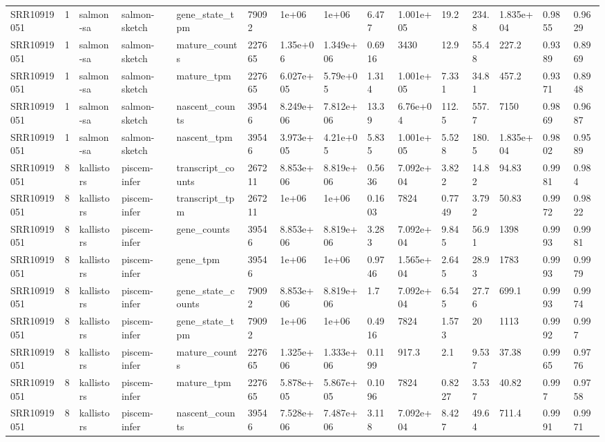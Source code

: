 \begin{tabular}{lllllllllllllll}
SRR10919051 & 1 & salmon-sa & salmon-sketch & gene\_state\_tpm & 79092 & 1e+06 & 1e+06 & 6.477 & 1.001e+05 & 19.2 & 234.8 & 1.835e+04 & 0.9855 & 0.9629 \\
SRR10919051 & 1 & salmon-sa & salmon-sketch & mature\_counts & 227665 & 1.35e+06 & 1.349e+06 & 0.6916 & 3430 & 12.9 & 55.48 & 227.2 & 0.9389 & 0.8969 \\
SRR10919051 & 1 & salmon-sa & salmon-sketch & mature\_tpm & 227665 & 6.027e+05 & 5.79e+05 & 1.314 & 1.001e+05 & 7.331 & 34.81 & 457.2 & 0.9371 & 0.8948 \\
SRR10919051 & 1 & salmon-sa & salmon-sketch & nascent\_counts & 39546 & 8.249e+06 & 7.812e+06 & 13.39 & 6.76e+04 & 112.5 & 557.7 & 7150 & 0.9869 & 0.9687 \\
SRR10919051 & 1 & salmon-sa & salmon-sketch & nascent\_tpm & 39546 & 3.973e+05 & 4.21e+05 & 5.835 & 1.001e+05 & 5.528 & 180.5 & 1.835e+04 & 0.9802 & 0.9589 \\
SRR10919051 & 8 & kallistors & piscem-infer & transcript\_counts & 267211 & 8.853e+06 & 8.819e+06 & 0.5636 & 7.092e+04 & 3.822 & 14.82 & 94.83 & 0.9981 & 0.984 \\
SRR10919051 & 8 & kallistors & piscem-infer & transcript\_tpm & 267211 & 1e+06 & 1e+06 & 0.1603 & 7824 & 0.7749 & 3.792 & 50.83 & 0.9972 & 0.9822 \\
SRR10919051 & 8 & kallistors & piscem-infer & gene\_counts & 39546 & 8.853e+06 & 8.819e+06 & 3.283 & 7.092e+04 & 9.845 & 56.91 & 1398 & 0.9993 & 0.9981 \\
SRR10919051 & 8 & kallistors & piscem-infer & gene\_tpm & 39546 & 1e+06 & 1e+06 & 0.9746 & 1.565e+04 & 2.645 & 28.93 & 1783 & 0.9993 & 0.9979 \\
SRR10919051 & 8 & kallistors & piscem-infer & gene\_state\_counts & 79092 & 8.853e+06 & 8.819e+06 & 1.7 & 7.092e+04 & 6.545 & 27.76 & 699.1 & 0.9993 & 0.9974 \\
SRR10919051 & 8 & kallistors & piscem-infer & gene\_state\_tpm & 79092 & 1e+06 & 1e+06 & 0.4916 & 7824 & 1.573 & 20 & 1113 & 0.9992 & 0.997 \\
SRR10919051 & 8 & kallistors & piscem-infer & mature\_counts & 227665 & 1.325e+06 & 1.333e+06 & 0.1199 & 917.3 & 2.1 & 9.537 & 37.38 & 0.9965 & 0.9776 \\
SRR10919051 & 8 & kallistors & piscem-infer & mature\_tpm & 227665 & 5.878e+05 & 5.867e+05 & 0.1096 & 7824 & 0.8227 & 3.537 & 40.82 & 0.997 & 0.9758 \\
SRR10919051 & 8 & kallistors & piscem-infer & nascent\_counts & 39546 & 7.528e+06 & 7.487e+06 & 3.118 & 7.092e+04 & 8.427 & 49.64 & 711.4 & 0.9991 & 0.9971 \\

\end{tabular}
